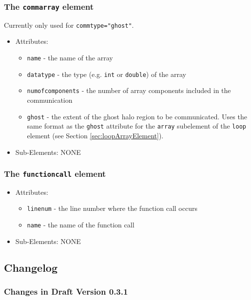 \documentclass{article}
\begin{document}
\subsubsection{The {\tt commarray} element}
  Currently only used for {\tt commtype="ghost"}.
  \begin{itemize}
    \item Attributes:
    \begin{itemize}
      \item {\tt name} - the name of the array
      \item {\tt datatype} - the type (e.g. {\tt int} or {\tt double})
        of the array
      \item {\tt numofcomponents} - the number of array components
        included in the communication
      \item {\tt ghost} - the extent of the ghost halo region to be
        communicated.  Uses the same format as the {\tt ghost} attribute
        for the {\tt array} subelement of the {\tt loop} element (see
        Section \ref{sec:loopArrayElement}).
    \end{itemize}
    \item Sub-Elements: NONE
  \end{itemize}

\subsubsection{The {\tt functioncall} element}
  \begin{itemize}
    \item Attributes:
    \begin{itemize}
      \item {\tt linenum} - the line number where the function call occurs
      \item {\tt name} - the name of the function call
    \end{itemize}
    \item Sub-Elements: NONE
  \end{itemize}

\subsection{Changelog}

\subsubsection{Changes in Draft Version 0.3.1}
\end{document}
